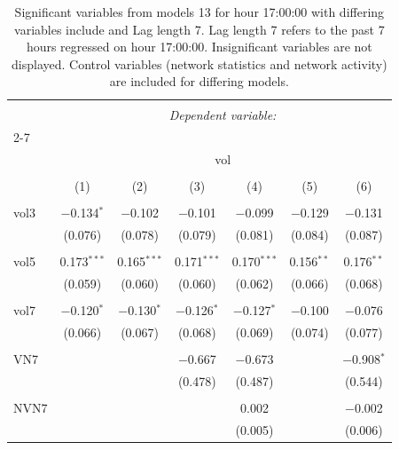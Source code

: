 
\begin{table}[!htbp] \centering 
  \caption{Significant variables from models 13 for hour 17:00:00 with differing variables include 
                               and Lag length 7. Lag length 7 refers to the past 7 hours regressed on hour 17:00:00. 
                               Insignificant variables are not displayed. 
                               Control variables (network statistics and network activity) are 
                               included for differing models.} 
  \label{Volumemodels1_t_hourlagged4} 
\scriptsize 
\begin{tabular}{@{\extracolsep{5pt}}lcccccc} 
\\[-1.8ex]\hline 
\hline \\[-1.8ex] 
 & \multicolumn{6}{c}{\textit{Dependent variable:}} \\ 
\cline{2-7} 
\\[-1.8ex] & \multicolumn{6}{c}{vol} \\ 
\\[-1.8ex] & (1) & (2) & (3) & (4) & (5) & (6)\\ 
\hline \\[-1.8ex] 
 vol3 & $-$0.134$^{*}$ & $-$0.102 & $-$0.101 & $-$0.099 & $-$0.129 & $-$0.131 \\ 
  & (0.076) & (0.078) & (0.079) & (0.081) & (0.084) & (0.087) \\ 
  & & & & & & \\ 
 vol5 & 0.173$^{***}$ & 0.165$^{***}$ & 0.171$^{***}$ & 0.170$^{***}$ & 0.156$^{**}$ & 0.176$^{**}$ \\ 
  & (0.059) & (0.060) & (0.060) & (0.062) & (0.066) & (0.068) \\ 
  & & & & & & \\ 
 vol7 & $-$0.120$^{*}$ & $-$0.130$^{*}$ & $-$0.126$^{*}$ & $-$0.127$^{*}$ & $-$0.100 & $-$0.076 \\ 
  & (0.066) & (0.067) & (0.068) & (0.069) & (0.074) & (0.077) \\ 
  & & & & & & \\ 
 VN7 &  &  & $-$0.667 & $-$0.673 &  & $-$0.908$^{*}$ \\ 
  &  &  & (0.478) & (0.487) &  & (0.544) \\ 
  & & & & & & \\ 
 NVN7 &  &  &  & 0.002 &  & $-$0.002 \\ 
  &  &  &  & (0.005) &  & (0.006) \\ 

\end{tabular}
\end{table}
